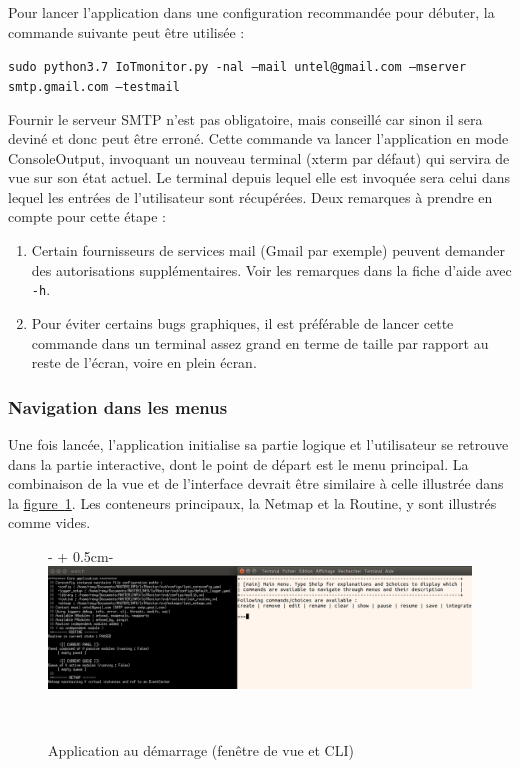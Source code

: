 \documentclass[]{article}
\newcommand{\wordlink}[2]{\hyperref[#1]{#2~\ref{#1}}}
\begin{document}
\newpage

\par Pour lancer l'application dans une configuration recommandée pour débuter, la commande suivante peut être utilisée :
\begin{center}
\texttt{sudo python3.7 IoTmonitor.py -nal --mail untel@gmail.com --mserver smtp.gmail.com --testmail}
\end{center} 

Fournir le serveur SMTP n'est pas obligatoire, mais conseillé car sinon il sera deviné et donc peut être erroné. Cette commande va lancer l'application en mode ConsoleOutput, invoquant un nouveau terminal (xterm par défaut) qui servira de vue sur son état actuel. Le terminal depuis lequel elle est invoquée sera celui dans lequel les entrées de l'utilisateur sont récupérées. Deux remarques à prendre en compte pour cette étape :

\begin{enumerate}
\item Certain fournisseurs de services mail (Gmail par exemple) peuvent demander des autorisations supplémentaires. Voir les remarques dans la fiche d'aide avec \texttt{-h}.
\vspace{0.2cm}
\item Pour éviter certains bugs graphiques, il est préférable de lancer cette commande dans un terminal assez grand en terme de taille par rapport au reste de l'écran, voire en plein écran.
\end{enumerate}

\subsubsection{Navigation dans les menus}

Une fois lancée, l'application initialise sa partie logique et l'utilisateur se retrouve dans la partie interactive, dont le point de départ est le menu principal. La combinaison de la vue et de l'interface devrait être similaire à celle illustrée dans la \wordlink{startapp}{figure}. Les conteneurs principaux, la Netmap et la Routine, y sont illustrés comme vides.

\begin{figure}[!ht]
   \begin{adjustwidth}{-\oddsidemargin-1in + 0.5cm}{-\rightmargin}
     \centering
     \includegraphics[width=\paperwidth - 1cm]{startapp}
     \caption{Application au démarrage (fenêtre de vue et CLI)}
     \label{startapp}
   \end{adjustwidth}
   \
\end{figure}
\end{document}
